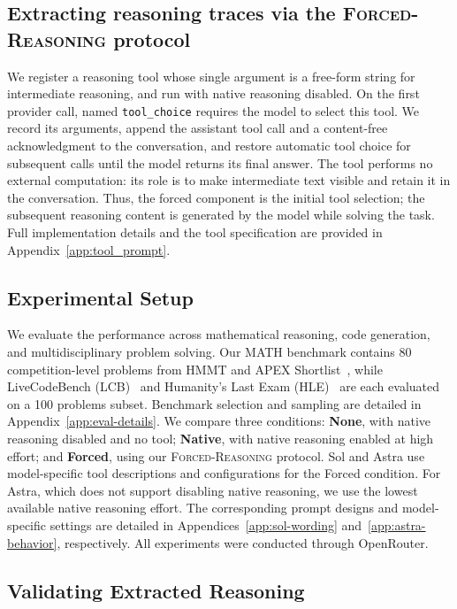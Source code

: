 \documentclass[10pt,letterpaper]{article}
\newcommand{\method}{\textsc{Forced-Reasoning}}
\begin{document}
\subsection{Extracting reasoning traces via the \method{} protocol}
We register a reasoning tool whose single argument is a
free-form string for intermediate reasoning, and run with native reasoning
disabled.
On the first provider call, named \texttt{tool\_choice} requires the model to select this tool.
We record its arguments, append the assistant tool call and a content-free acknowledgment to the conversation, and restore automatic tool choice for subsequent calls until the model returns its final answer.
The tool performs no external computation: its role is to make intermediate text visible and retain it in the conversation.
Thus, the forced component is the initial tool selection; the subsequent reasoning content is generated by the model while solving the task. Full implementation details and the tool specification are provided in Appendix~\ref{app:tool_prompt}.


\subsection{Experimental Setup}

We evaluate the performance across mathematical reasoning, code generation, and multidisciplinary problem solving. Our MATH benchmark contains 80 competition-level problems from HMMT and APEX Shortlist~\citep{dekoninck2026matharena}, while LiveCodeBench (LCB)~\citep{jain2024livecodebench} and Humanity's Last Exam (HLE)~\citep{phan2025hle} are each evaluated on a 100 problems subset. Benchmark selection and sampling are detailed in Appendix~\ref{app:eval-details}.
We compare three conditions: \textbf{None}, with native reasoning disabled and no tool; \textbf{Native}, with native reasoning enabled at high effort; and \textbf{Forced}, using our \method{} protocol. Sol and Astra use model-specific tool descriptions and configurations for the Forced condition.
For Astra, which does not support disabling native reasoning, we use the lowest available native reasoning effort. The corresponding prompt designs and model-specific settings are detailed in Appendices~\ref{app:sol-wording} and~\ref{app:astra-behavior}, respectively. All experiments were conducted through OpenRouter.


\subsection{Validating Extracted Reasoning}
\label{sec:closed-validation}
\end{document}
